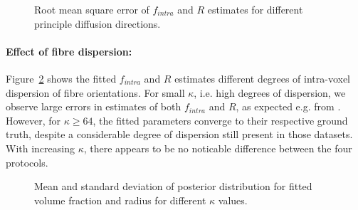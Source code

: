 \begin{figure}[!h]
   {
\centering
    
    
    
  }
	\caption{Root mean square error of $f_{intra}$ and $R$ estimates for different principle diffusion directions.}
	\label{fig:chapter7 exp1 angular vals 60mT}
\end{figure}


\paragraph{Effect of fibre dispersion: } Figure~\ref{fig:chapter7 exp1 dispersion 60mT} shows the fitted $f_{intra}$ and $R$ estimates different degrees of intra-voxel dispersion of fibre orientations. For small $\kappa$, i.e. high degrees of dispersion, we observe large errors in estimates of both $f_{intra}$ and $R$, as expected e.g. from \citep{Zhang:2011}. However, for $\kappa \ge 64$, the fitted parameters converge to their respective ground truth, despite a considerable degree of dispersion still present in those datasets. With increasing $\kappa$, there appears to be no noticable difference between the four protocols.

\begin{figure}[ht]
	\centering
	
	
	\caption{Mean and standard deviation of posterior distribution for fitted volume fraction and radius for different $\kappa$ values.}
	\label{fig:chapter7 exp1 dispersion 60mT}
\end{figure}

